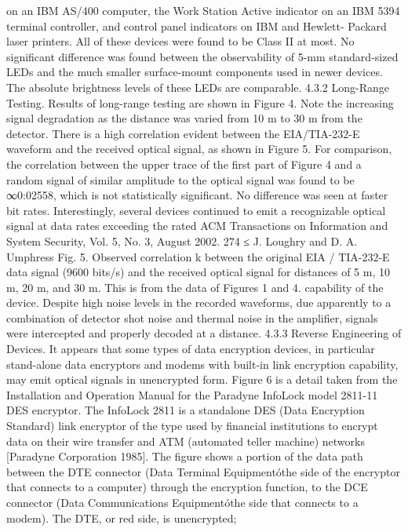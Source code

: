 on an IBM AS/400 computer, the Work Station Active indicator on an IBM 
5394 terminal controller, and control panel indicators on IBM and Hewlett- 
Packard laser printers. All of these devices were found to be Class II at 
most. 
No significant difference was found between the observability of 5-mm 
standard-sized LEDs and the much smaller surface-mount components 
used in newer devices. The absolute brightness levels of these LEDs are 
comparable. 
4.3.2 Long-Range Testing. Results of long-range testing are shown in 
Figure 4. Note the increasing signal degradation as the distance was varied 
from 10 m to 30 m from the detector. There is a high correlation evident between 
the EIA/TIA-232-E waveform and the received optical signal, as shown 
in Figure 5. For comparison, the correlation between the upper trace of the first 
part of Figure 4 and a random signal of similar amplitude to the optical signal 
was found to be ∞0:02558, which is not statistically significant. 
No difference was seen at faster bit rates. Interestingly, several devices continued 
to emit a recognizable optical signal at data rates exceeding the rated 
ACM Transactions on Information and System Security, Vol. 5, No. 3, August 2002.
274 ≤ J. Loughry and D. A. Umphress 
Fig. 5. Observed correlation k between the original EIA / TIA-232-E data signal (9600 bits/s) and 
the received optical signal for distances of 5 m, 10 m, 20 m, and 30 m. This is from the data of 
Figures 1 and 4. 
capability of the device. Despite high noise levels in the recorded waveforms, 
due apparently to a combination of detector shot noise and thermal noise in the 
amplifier, signals were intercepted and properly decoded at a distance. 
4.3.3 Reverse Engineering of Devices. It appears that some types of data 
encryption devices, in particular stand-alone data encryptors and modems with 
built-in link encryption capability, may emit optical signals in unencrypted 
form. 
Figure 6 is a detail taken from the Installation and Operation Manual for 
the Paradyne InfoLock model 2811-11 DES encryptor. The InfoLock 2811 is a 
standalone DES (Data Encryption Standard) link encryptor of the type used 
by financial institutions to encrypt data on their wire transfer and ATM (automated 
teller machine) networks [Paradyne Corporation 1985]. 
The figure shows a portion of the data path between the DTE connector (Data 
Terminal Equipmentóthe side of the encryptor that connects to a computer) 
through the encryption function, to the DCE connector (Data Communications 
Equipmentóthe side that connects to a modem). The DTE, or red side, is unencrypted; 

